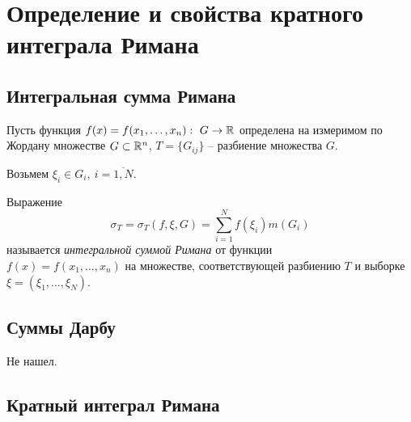 \section{Определение и свойства кратного интеграла Римана}

\setcounter{subsection}{91}

\subsection{Интегральная сумма Римана}

\begin{definition}
    Пусть функция $ f(x) = f(x_1,\ldots,x_n): \ G \rightarrow \R $ определена на измеримом по Жордану множестве $ G \subset \mathbb{R}^n $, $T = \{G_{ij}\}$ -- разбиение множества $ G $.

    Возьмем $ \xi_i \in G_i, \ i = \overline{1,N} $.

    Выражение
    \[
        \sigma_T = \sigma_T(f,\xi,G) = \sum_{i=1}^{N}f(\xi_i)m(G_i)
    \]
    называется \emph{интегральной суммой Римана} от функции \\ $ f(x) = f(x_1,\ldots,x_n) $ на множестве, соответствующей разбиению $ T $ и выборке $ \xi = (\xi_1,\ldots,\xi_N) $.
\end{definition}

\subsection{Суммы Дарбу}

Не нашел.

\subsection{Кратный интеграл Римана}

